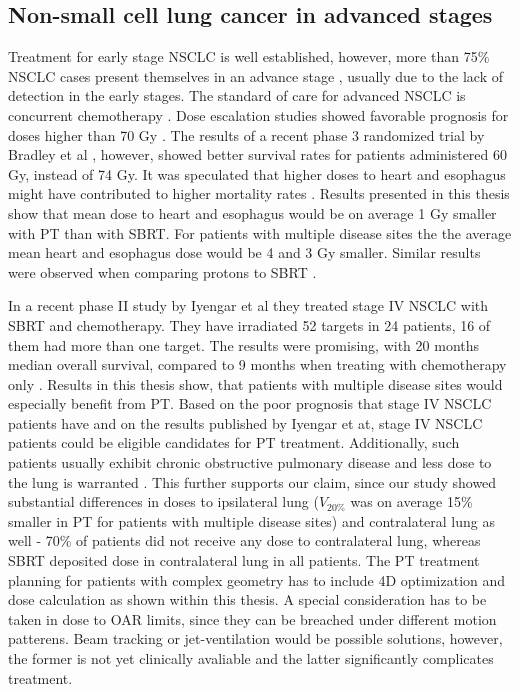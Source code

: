 \documentclass[type=dr, dr=rernat, accentcolor=tud7b,colorbacktitle, bigchapter, openright, twoside, 12pt ]{tudthesis}
\begin{document}
\subsection{Non-small cell lung cancer in advanced stages}

Treatment for early stage NSCLC is well established, however, more than 75\% NSCLC cases present themselves in an advance stage \cite{Jemal2009}, 
usually due to the lack of detection in the early stages. The standard of care for advanced NSCLC is concurrent chemotherapy \cite{Oshiro2014}.
Dose escalation studies showed favorable prognosis for doses higher than 70 Gy \cite{Hayman2001, Rosenman2002, Socinski2008}. 
The results of a recent phase 3 randomized trial by Bradley et al \cite{Bradley2015}, however, showed better survival rates for patients administered 60 Gy,
instead of 74 Gy. It was speculated that higher doses to heart and esophagus might have contributed to higher mortality rates \cite{Cox2012}. 
Results presented in this thesis show that mean dose to heart and esophagus would be on average 1 Gy
smaller with PT than with SBRT. For patients with multiple disease sites the the average mean heart and esophagus dose would be 4 and 3 Gy smaller.
Similar results were observed when comparing protons to SBRT \cite{Georg2008}. 

In a recent phase II study by Iyengar et al \cite{Iyengar2014} they treated stage IV NSCLC with SBRT and chemotherapy. 
They have irradiated 52 targets in 24 patients, 16 of them had more than one target. The results were promising, with 20 months median overall survival, 
compared to 9 months when treating with chemotherapy only \cite{Tsao2008}. Results in this thesis show, that patients with multiple disease sites 
would especially benefit from PT. Based on the poor prognosis that stage IV NSCLC patients have and on the results published by Iyengar et at,
stage IV NSCLC patients could be eligible candidates for PT treatment. Additionally, such patients usually exhibit chronic obstructive pulmonary disease and 
less dose to the lung is warranted \cite{Westover2012}. This further supports our claim, since our study showed substantial differences in 
doses to ipsilateral lung ($V_{20\%}$ was on average 15\% smaller in PT for patients with multiple disease sites) and 
contralateral lung as well - 70\% of patients did not receive any dose to contralateral lung, whereas SBRT deposited dose in contralateral lung in all patients.
The PT treatment planning for patients with complex geometry has to include 4D optimization and dose calculation as shown within this thesis. 
A special consideration has to be taken in dose to OAR limits, since they can be breached under different motion patterens.
Beam tracking \cite{Bert2007} or jet-ventilation \cite{Santiago2013} would be possible solutions, however, the former is not yet clinically avaliable and the latter 
significantly complicates treatment.
\end{document}
